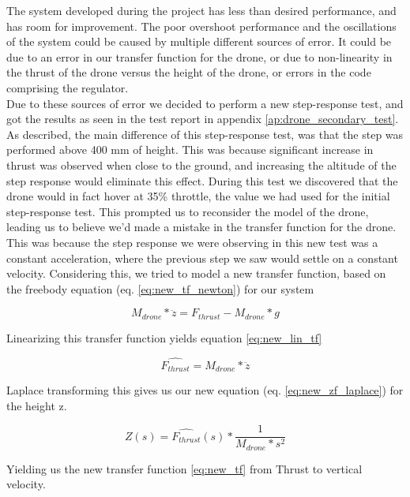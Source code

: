The system developed during the project has less than desired performance, and has room for improvement. The poor overshoot performance and the oscillations of the system could be caused by multiple different sources of error. It could be due to an error in our transfer function for the drone, or due to non-linearity in the thrust of the drone versus the height of the drone, or errors in the code comprising the regulator.\\
Due to these sources of error we decided to perform a new step-response test, and got the results as seen in the test report in appendix \ref{ap:drone_secondary_test}.
As described, the main difference of this step-response test, was that the step was performed above 400 mm of height. This was because significant increase in thrust was observed when close to the ground, and increasing the altitude of the step response would eliminate this effect.
During this test we discovered that the drone would in fact hover at 35\% throttle, the value we had used for the initial step-response test.
This prompted us to reconsider the model of the drone, leading us to believe we'd made a mistake in the transfer function for the drone. This was because the step response we were observing in this new test was a constant acceleration, where the previous step we saw would settle on a constant velocity.
Considering this, we tried to model a new transfer function, based on the freebody equation (eq. \ref{eq:new_tf_newton}) for our system

\begin{equation} \label{eq:new_tf_newton}
    M_{drone} * \ddot{z} = F_{thrust} - M_{drone} * g
\end{equation}

Linearizing this transfer function yields equation \ref{eq:new_lin_tf}

\begin{equation} \label{eq:new_lin_tf}
    \hat{F_{thrust}} = M_{drone} * \ddot{z}
\end{equation}

Laplace transforming this gives us our new equation (eq. \ref{eq:new_zf_laplace}) for the height z.

\begin{equation} \label{eq:new_zf_laplace}
    Z(s) = \hat{F_{thrust}}(s) * \frac{1}{M_{drone} * s^2}
\end{equation}

Yielding us the new transfer function \ref{eq:new_tf} from Thrust to vertical velocity.

